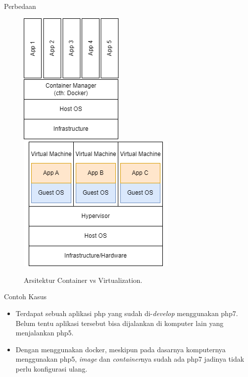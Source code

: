 \documentclass[aspectratio=169, table]{beamer}
\begin{document}
	\begin{frame}{Perbedaan}
		\begin{figure}[h]
			\centering
			\includegraphics[width=.20\textwidth]{ContainerDiagram.png}
			\includegraphics[width=.25\textwidth]{VirtualizationDiagram.png}
			\caption{Arsitektur Container vs Virtualization.}
			\label{fig:ContainerDiagram}
		\end{figure}
	\end{frame}
	
	\begin{frame}{Contoh Kasus}
		\begin{itemize}
			\item Terdapat sebuah aplikasi php yang sudah di-\textit{develop} menggunakan php7. Belum tentu aplikasi tersebut bisa dijalankan di komputer lain yang menjalankan php5.
			\item Dengan menggunakan docker, meskipun pada dasarnya komputernya menggunakan php5, \textit{image} dan \textit{container}nya sudah ada php7 jadinya tidak perlu konfigurasi ulang.
		\end{itemize}
	\end{frame}
	
\end{document}
